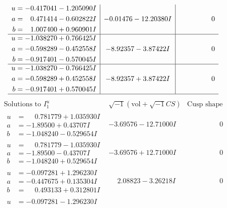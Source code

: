 \documentclass[1p]{elsarticle_modified}
\theoremstyle{definition}
\newcommand{\I}{\sqrt{-1}}
\begin{document}
$$\begin{array}{c|c|c}
\begin{aligned}
u &= -0.417041 - 1.205090 I \\
a &= \phantom{-}0.471414 - 0.602822 I \\
b &= \phantom{-}1.007400 + 0.960901 I\end{aligned}
 & -0.01476 - 12.20380 I & \phantom{-0.000000 } 0 \\ \hline\begin{aligned}
u &= -1.038270 + 0.766425 I \\
a &= -0.598289 - 0.452558 I \\
b &= -0.917401 - 0.570045 I\end{aligned}
 & -8.92357 - 3.87422 I & \phantom{-0.000000 } 0 \\ \hline\begin{aligned}
u &= -1.038270 - 0.766425 I \\
a &= -0.598289 + 0.452558 I \\
b &= -0.917401 + 0.570045 I\end{aligned}
 & -8.92357 + 3.87422 I & \phantom{-0.000000 } 0\\
 \hline 
 \end{array}$$\newpage$$\begin{array}{c|c|c}  
\text{Solutions to }I^u_{1}& \I (\text{vol} + \sqrt{-1}CS) & \text{Cusp shape}\\
 \hline 
\begin{aligned}
u &= \phantom{-}0.781779 + 1.035930 I \\
a &= -1.89500 + 0.43707 I \\
b &= -1.048240 - 0.529654 I\end{aligned}
 & -3.69576 - 12.71000 I & \phantom{-0.000000 } 0 \\ \hline\begin{aligned}
u &= \phantom{-}0.781779 - 1.035930 I \\
a &= -1.89500 - 0.43707 I \\
b &= -1.048240 + 0.529654 I\end{aligned}
 & -3.69576 + 12.71000 I & \phantom{-0.000000 } 0 \\ \hline\begin{aligned}
u &= -0.097281 + 1.296230 I \\
a &= -0.447675 + 0.135304 I \\
b &= \phantom{-}0.493133 + 0.312801 I\end{aligned}
 & \phantom{-}2.08823 - 3.26218 I & \phantom{-0.000000 } 0 \\ \hline\begin{aligned}
u &= -0.097281 - 1.296230 I \\

\end{aligned}
\end{array}$$
\end{document}
